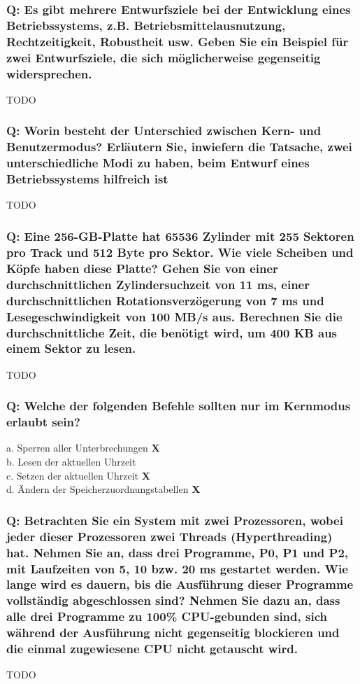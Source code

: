\documentclass[12pt,a4paper]{univention}
\begin{document}
\subsubsection{Q: Es gibt mehrere Entwurfsziele bei der Entwicklung eines Betriebssystems, z.B. Betriebsmittelausnutzung, Rechtzeitigkeit, Robustheit usw. Geben Sie ein Beispiel für zwei Entwurfsziele, die sich möglicherweise gegenseitig widersprechen.}
TODO
\subsubsection{Q: Worin besteht der Unterschied zwischen Kern- und Benutzermodus? Erläutern Sie, inwiefern die Tatsache, zwei unterschiedliche Modi zu haben, beim Entwurf eines Betriebssystems hilfreich ist}
TODO
\subsubsection{Q: Eine 256-GB-Platte hat 65536 Zylinder mit 255 Sektoren pro Track und 512 Byte pro Sektor. Wie viele Scheiben und Köpfe haben diese Platte? Gehen Sie von einer durchschnittlichen Zylindersuchzeit von 11 ms, einer durchschnittlichen Rotationsverzögerung von 7 ms und Lesegeschwindigkeit von 100 MB/s aus. Berechnen Sie die durchschnittliche Zeit, die benötigt wird, um 400 KB aus einem Sektor zu lesen.}
TODO 
\subsubsection{Q: Welche der folgenden Befehle sollten nur im Kernmodus erlaubt sein?}
a. Sperren aller Unterbrechungen \textbf{X}\\ 
b. Lesen der aktuellen Uhrzeit \\
c. Setzen der aktuellen Uhrzeit \textbf{X}\\
d. Ändern der Speicherzuordnungstabellen \textbf{X}
\subsubsection{Q: Betrachten Sie ein System mit zwei Prozessoren, wobei jeder dieser Prozessoren zwei Threads (Hyperthreading) hat. Nehmen Sie an, dass drei Programme, P0, P1 und P2, mit Laufzeiten von 5, 10 bzw. 20 ms gestartet werden. Wie lange wird es dauern, bis die Ausführung dieser Programme vollständig abgeschlossen sind? Nehmen Sie dazu an, dass alle drei Programme zu 100\% CPU-gebunden sind, sich während der Ausführung nicht gegenseitig blockieren und die einmal zugewiesene CPU nicht getauscht wird.}
TODO
\newpage
\end{document}
